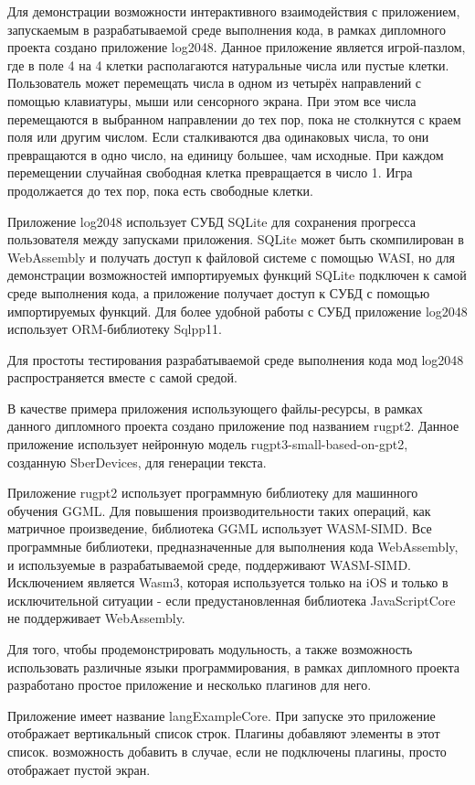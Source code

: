 Для демонстрации возможности интерактивного взаимодействия с приложением, запускаемым в разрабатываемой среде выполнения кода, в рамках дипломного проекта создано приложение log2048.
Данное приложение является игрой-пазлом, где в поле 4 на 4 клетки располагаются натуральные числа или пустые клетки.
Пользователь может перемещать числа в одном из четырёх направлений с помощью клавиатуры, мыши или сенсорного экрана.
При этом все числа перемещаются в выбранном направлении до тех пор, пока не столкнутся с краем поля или другим числом. 
Если сталкиваются два одинаковых числа, то они превращаются в одно число, на единицу большее, чам исходные.
При каждом перемещении случайная свободная клетка превращается в число 1.
Игра продолжается до тех пор, пока есть свободные клетки.

Приложение log2048 использует СУБД SQLite для сохранения прогресса пользователя между запусками приложения.
SQLite может быть скомпилирован в WebAssembly и получать доступ к файловой системе с помощью WASI, но для демонстрации возможностей импортируемых функций SQLite подключен к самой среде выполнения кода, а приложение получает доступ к СУБД с помощью импортируемых функций.
Для более удобной работы с СУБД приложение log2048 использует ORM-библиотеку Sqlpp11.

Для простоты тестирования разрабатываемой среде выполнения кода мод log2048 распространяется вместе с самой средой.

В качестве примера приложения использующего файлы-ресурсы, в рамках данного дипломного проекта создано приложение под названием rugpt2.
Данное приложение использует нейронную модель rugpt3-small-based-on-gpt2, созданную SberDevices, для генерации текста.

Приложение rugpt2 использует программную библиотеку для машинного обучения GGML.
Для повышения производительности таких операций, как матричное произведение, библиотека GGML использует WASM-SIMD.
Все программные библиотеки, предназначенные для выполнения кода WebAssembly, и используемые в разрабатываемой среде, поддерживают WASM-SIMD.
Исключением является Wasm3, которая используется только на iOS и только в исключительной ситуации - если предустановленная библиотека JavaScriptCore не поддерживает WebAssembly.

Для того, чтобы продемонстрировать модульность, а также возможность использовать различные языки программирования, в рамках дипломного проекта разработано простое приложение и несколько плагинов для него.

Приложение имеет название langExampleCore.
При запуске это приложение отображает вертикальный список строк.
Плагины добавляют элементы в этот список. возможность добавить в случае, если не подключены плагины, просто отображает пустой экран.
